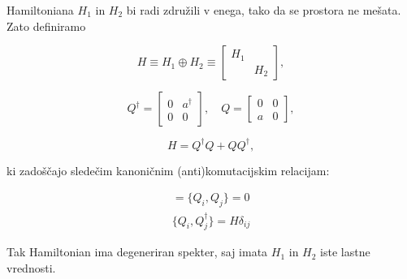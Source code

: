 Hamiltoniana $H_1$ in $H_2$ bi radi zdru\v zili v enega, tako da se prostora ne me\v sata. Zato
definiramo

\begin{equation}
	H \equiv H_1 \oplus H_2 \equiv \begin{bmatrix}H_1 & \\
		& H_2 \end{bmatrix},
\end{equation}

\begin{equation}
	Q^\dagger = \begin{bmatrix} 0 & a^\dagger \\
		0 & 0 \end{bmatrix}, \quad
	Q = \begin{bmatrix} 0 & 0 \\
		a & 0 \end{bmatrix},
\end{equation}

\begin{equation}
	H = Q^\dagger Q + QQ^\dagger,
\end{equation}

ki zado\v s\v cajo slede\v cim kanoni\v cnim (anti)komutacijskim relacijam:

\begin{align}
	[Q_i,Q_j] = \{Q_i,Q_j\} = 0 \\
	\{Q_i,Q_j^\dagger\} = H\delta_{ij}
\end{align}

Tak Hamiltonian ima degeneriran spekter, saj imata $H_1$ in $H_2$ iste lastne vrednosti.


